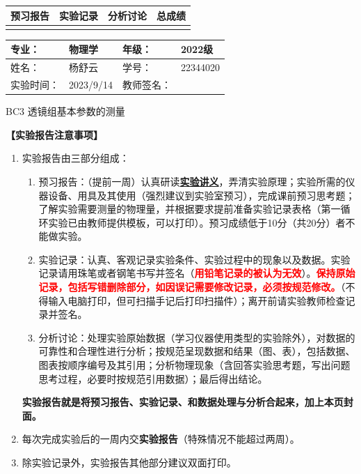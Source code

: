 \documentclass[dvipsnames, svgnames,a4paper,11pt]{article}
\begin{document}
	
	
	
	\begin{table}
		\renewcommand\arraystretch{1.7}
		\begin{tabularx}{\textwidth}{
				|X|X|X|X
				|X|X|X|X|}
			\hline
			\multicolumn{2}{|c|}{预习报告}&\multicolumn{2}{|c|}{实验记录}&\multicolumn{2}{|c|}{分析讨论}&\multicolumn{2}{|c|}{总成绩}\\
			\hline
			& & & & & & & \\
			\hline
		\end{tabularx}
	\end{table}
	
	\begin{table}
		\renewcommand\arraystretch{1.7}
		\begin{tabularx}{\textwidth}{|X|X|X|X|}
			\hline
			专业： & 物理学 &年级： & 2022级\\
			\hline
			姓名： & 杨舒云  & 学号： & 22344020\\
			\hline
			实验时间： & 2023/9/14 & 教师签名： & \\
			\hline
		\end{tabularx}
	\end{table}
	
	\begin{center}
		\LARGE BC3 \quad 透镜组基本参数的测量
	\end{center}
	
	\textbf{【实验报告注意事项】}
	\begin{enumerate}
		\item 实验报告由三部分组成：
		\begin{enumerate}
			\item 预习报告：（提前一周）认真研读\underline{\textbf{实验讲义}}，弄清实验原理；实验所需的仪器设备、用具及其使用（强烈建议到实验室预习），完成课前预习思考题；了解实验需要测量的物理量，并根据要求提前准备实验记录表格（第一循环实验已由教师提供模板，可以打印）。预习成绩低于10分（共20分）者不能做实验。
			\item 实验记录：认真、客观记录实验条件、实验过程中的现象以及数据。实验记录请用珠笔或者钢笔书写并签名（\textcolor{red}{\textbf{用铅笔记录的被认为无效}}）。\textcolor{red}{\textbf{保持原始记录，包括写错删除部分，如因误记需要修改记录，必须按规范修改。}}（不得输入电脑打印，但可扫描手记后打印扫描件）；离开前请实验教师检查记录并签名。
			\item 分析讨论：处理实验原始数据（学习仪器使用类型的实验除外），对数据的可靠性和合理性进行分析；按规范呈现数据和结果（图、表），包括数据、图表按顺序编号及其引用；分析物理现象（含回答实验思考题，写出问题思考过程，必要时按规范引用数据）；最后得出结论。
		\end{enumerate}
		\textbf{实验报告就是将预习报告、实验记录、和数据处理与分析合起来，加上本页封面。}
		\item 每次完成实验后的一周内交\textbf{实验报告}（特殊情况不能超过两周）。
		\item 除实验记录外，实验报告其他部分建议双面打印。
	\end{enumerate}
	
\end{document}
